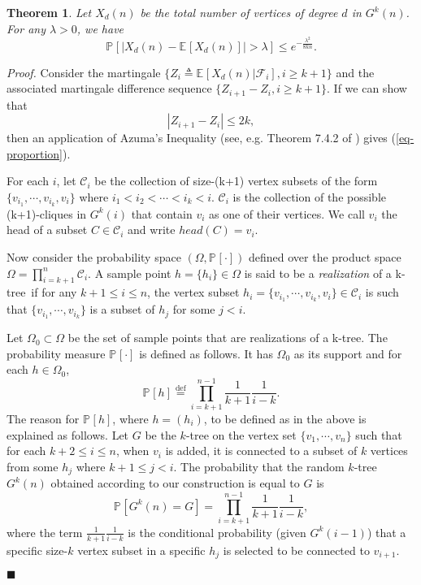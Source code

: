 \documentclass[11pt]{article}
\newtheorem{theorem}{Theorem}[section]
\providecommand{\expectation}[2]{\mathbb{E}_{#2}\left[#1\right]}
\providecommand{\probab}[2]{\mathbb{P}_{#2}\left[#1\right]}
\newenvironment{proof}[0]{\textit{Proof.} }{\hfill  $\blacksquare$ }
\providecommand{\rktree}[2]{G^{#1}(#2)}
\providecommand{\tdeg}[2]{X_{#1}(#2)}
\providecommand{\ktree}{k-tree}
\begin{document}
\begin{theorem}
\label{theorem-proportion}
Let $\tdeg{d}{n}$ be the total number of vertices of degree $d$ in $\rktree{k}{n}$. For any $\lambda > 0$, we have
\begin{equation}
\label{eq-proportion}
\probab{|\tdeg{d}{n} - \expectation{\tdeg{d}{n}}{}| > \lambda}{} \leq  e^{-\frac{\lambda^2}{8kn}}{}.
\end{equation}
\end{theorem}
\begin{proof}
Consider the martingale $\{Z_i \triangleq \expectation{\tdeg{d}{n} | \mathcal{F}_i}{}, i \geq k + 1\}$ and the associated martingale difference sequence
$ \{Z_{i + 1} - Z_{i},  i \geq k + 1\}.$
If we can show that
$$
    |Z_{i + 1} - Z_{i}| \leq 2k,
$$
then an application of Azuma's Inequality (see, e.g. Theorem 7.4.2 of \cite{alon00}) gives   (\ref{eq-proportion}).

For each $i$, let
$\mathcal{C}_i$ be the collection of size-(k+1) vertex subsets  of the form $\{v_{i_1}, \cdots, v_{i_{k}},  v_{i}\}$ where
$i_1 < i_2 < \cdots < i_{k} < i$. $\mathcal{C}_i$ is the collection of the possible (k+1)-cliques in $\rktree{k}{i}$ that
contain $v_i$ as one of their vertices. We call $v_i$ the head of a subset $C \in \mathcal{C}_{i}$ and write $head(C) = v_i$.

Now consider the probability space $(\Omega, \probab{\cdot}{})$ defined over the product space
$\Omega = \prod\limits_{i = k + 1}^{n} \mathcal{C}_i$. A sample point $h = \{h_i\} \in \Omega$ is
said to be a \textit{realization} of a \ktree\ if for any $k + 1 \leq i \leq n$, the vertex subset
$h_i = \{v_{i_1}, \cdots, v_{i_k}, v_i\} \in \mathcal{C}_i$ is such that $\{v_{i_1}, \cdots, v_{i_k}\}$ is a subset
of $h_j$ for some $j < i$.

Let $\Omega_{0} \subset \Omega$ be the set of sample points that are realizations of a \ktree.
The probability measure $\probab{\cdot}{}$ is defined as follows. It
has $\Omega_{0}$ as its support and for each $h\in \Omega_{0}$,
$$
  \probab{h}{} \stackrel{\text{def}}{=}  
  \prod\limits_{i = k + 1}^{n - 1} \frac{1}{k + 1}\frac{1}{i - k}.
$$
The reason for $\probab{h}{}$, where $h = (h_i)$, to be defined as in the above is explained  
as follows. Let $G$ be the $k$-tree on the vertex set $\{v_1, \cdots, v_n\}$ such that
for each $k+2 \leq i\leq n$, when $v_i$ is added, it is connected to
a subset of $k$ vertices from some $h_j$ where $k + 1 \leq j < i$.    
The probability that the random $k$-tree $\rktree{k}{n}$ obtained according to our construction
is equal to $G$ is
$$
\probab{\rktree{k}{n} = G}{} =
 \prod\limits_{i = k + 1}^{n - 1} \frac{1}{k + 1}\frac{1}{i - k},
$$ 
where the term $\frac{1}{k + 1}\frac{1}{i - k}$ is the conditional probability 
(given $\rktree{k}{i - 1}$) that a specific size-$k$ vertex subset in a specific $h_j$
is selected to be connected to $v_{i + 1}$.  



\end{proof}
\end{document}
